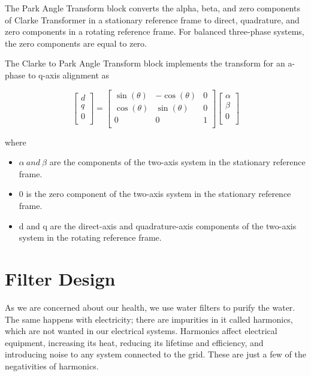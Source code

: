 \documentclass[12pt,a4paper]{book}
\begin{document}
The Park Angle Transform block converts the alpha, beta, and zero components of Clarke Transformer in a stationary reference frame to direct, quadrature, and zero components in a rotating reference frame. For balanced three-phase systems, the zero components are equal to zero.

The Clarke to Park Angle Transform block implements the transform for an a-phase to q-axis alignment as

\begin{equation}
  \begin{bmatrix}
    d \\
    q \\
    0 \\
    \end{bmatrix} = \begin{bmatrix}
    \sin(\theta) & - \cos(\theta) & 0 \\
    \cos(\theta) & \sin(\theta) & 0 \\
    0 & 0 & 1 \\
    \end{bmatrix}\begin{bmatrix}
    \alpha \\
    \beta \\
    0 \\
    \end{bmatrix}
  \label{equation:eq11}
\end{equation}

where
\begin{itemize}
  \item \(\alpha \ and \ \beta\) are the components of the two-axis system in the stationary reference frame.
  \item 0 is the zero component of the two-axis system in the stationary reference frame.
  \item d and q are the direct-axis and quadrature-axis components of the two-axis system in the rotating reference frame.
\end{itemize}

\section{Filter Design}
As we are concerned about our health, we use water filters to purify the water. The same happens with electricity; there are impurities in it called harmonics, which are not wanted in our electrical systems. Harmonics affect electrical equipment, increasing its heat, reducing its lifetime and efficiency, and introducing noise to any system connected to the grid. These are just a few of the negativities of harmonics.
\end{document}
